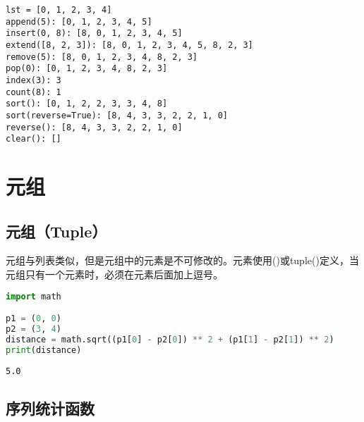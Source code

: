 \begin{tcolorbox}
	\begin{verbatim}
lst = [0, 1, 2, 3, 4]
append(5): [0, 1, 2, 3, 4, 5]
insert(0, 8): [8, 0, 1, 2, 3, 4, 5]
extend([8, 2, 3]): [8, 0, 1, 2, 3, 4, 5, 8, 2, 3]
remove(5): [8, 0, 1, 2, 3, 4, 8, 2, 3]
pop(0): [0, 1, 2, 3, 4, 8, 2, 3]
index(3): 3
count(8): 1
sort(): [0, 1, 2, 2, 3, 3, 4, 8]
sort(reverse=True): [8, 4, 3, 3, 2, 2, 1, 0]
reverse(): [8, 4, 3, 3, 2, 2, 1, 0]
clear(): []
\end{verbatim}
\end{tcolorbox}

\newpage

\section{元组}

\subsection{元组（Tuple）}

元组与列表类似，但是元组中的元素是不可修改的。元素使用()或tuple()定义，当元组只有一个元素时，必须在元素后面加上逗号。\\


\begin{lstlisting}[language=Python]
import math

p1 = (0, 0)
p2 = (3, 4)
distance = math.sqrt((p1[0] - p2[0]) ** 2 + (p1[1] - p2[1]) ** 2)
print(distance)
\end{lstlisting}

\begin{tcolorbox}
	\begin{verbatim}
5.0
\end{verbatim}
\end{tcolorbox}

\vspace{0.5cm}

\subsection{序列统计函数}

